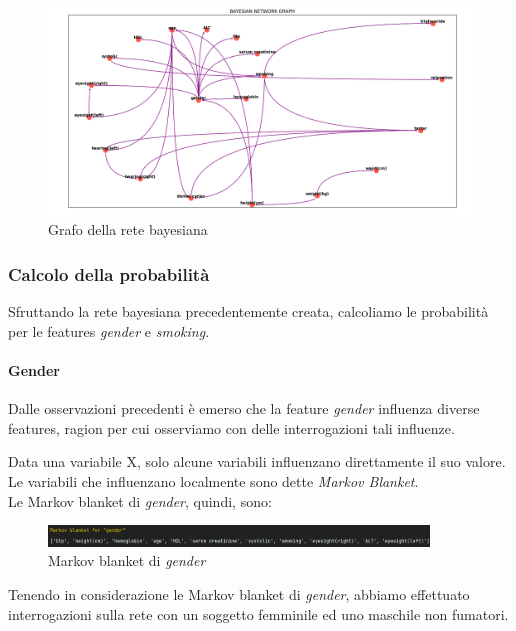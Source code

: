 \documentclass{article}
\begin{document}
\begin{figure}[H]
        \includegraphics[width=16.5cm]{rete}
        \centering
        \caption{Grafo della rete bayesiana}
        \centering
\end{figure}
%


\subsubsection{Calcolo della probabilità}

Sfruttando la rete bayesiana precedentemente creata, calcoliamo le probabilità per le features \textit{gender} e \textit{smoking}.

\paragraph{Gender}
Dalle osservazioni precedenti è emerso che la feature \textit{gender} influenza diverse features, ragion per cui osserviamo con delle interrogazioni tali influenze.

\noindent
Data una variabile X, solo alcune variabili influenzano direttamente il suo valore.\\Le variabili che influenzano localmente sono dette \textit{Markov Blanket}.\\
Le Markov blanket di \textit{gender}, quindi, sono:

\begin{figure}[H]
        \includegraphics[width=0.9\textwidth]{MARKgen}
        \centering
        \caption{Markov blanket di \textit{gender}}
        \centering
\end{figure}

\noindent
Tenendo in considerazione le Markov blanket di \textit{gender}, abbiamo effettuato interrogazioni sulla rete con un soggetto femminile ed uno maschile non fumatori. \\
\end{document}
